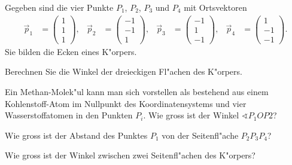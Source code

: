 Gegeben sind die vier Punkte 
$P_1$,
$P_2$,
$P_3$ und $P_4$
mit Ortsvektoren
\begin{align*}
\vec p_1&=\begin{pmatrix} 1\\ 1\\ 1\end{pmatrix},&
\vec p_2&=\begin{pmatrix}-1\\-1\\ 1\end{pmatrix},&
\vec p_3&=\begin{pmatrix}-1\\ 1\\-1\end{pmatrix},&
\vec p_4&=\begin{pmatrix} 1\\-1\\-1\end{pmatrix}.
\end{align*}
Sie bilden die Ecken eines K"orpers.
\begin{teilaufgaben}
\item Berechnen Sie die Winkel der dreieckigen Fl"achen des K"orpers.
\item Ein Methan-Molek"ul kann man sich vorstellen als bestehend aus
einem Kohlenstoff-Atom im Nullpunkt des Koordinatensystems und vier
Wasserstoffatomen in den Punkten $P_i$. Wie gross ist der Winkel
$\sphericalangle P_1 O P2$?
\item Wie gross ist der Abstand des Punktes $P_1$ von der Seitenfl"ache
$P_2P_3P_4$?
\item Wie gross ist der Winkel zwischen zwei Seitenfl"achen des K"orpers?
\end{teilaufgaben}

